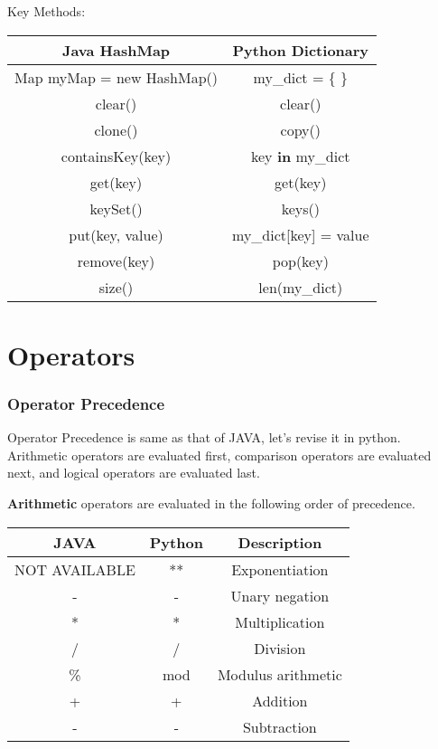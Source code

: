 \documentclass[a4paper,9pt]{extarticle}
\begin{document}
\begin{multicols*}{2}
Key Methods:
\begin{center}
 \begin{tabular}{||c | c||}
 \hline
 Java HashMap & Python Dictionary\\ [1ex]
 \hline\hline
 Map myMap = new HashMap() & my\_dict = \{ \}\\
 \hline
 clear() & clear()\\
 \hline
 clone() & copy()\\
 \hline
 containsKey(key) & key \textbf{in} my\_dict\\
 \hline
 get(key) & get(key)\\
 \hline
 keySet() & keys()\\
 \hline
 put(key, value) & my\_dict[key] = value\\
 \hline
 remove(key) & pop(key)\\
 \hline
 size() & len(my\_dict)\\
 \hline
\end{tabular}
\end{center}

\section{Operators}
\subsubsection{Operator Precedence}
Operator Precedence is same as that of JAVA, let's revise it in python. Arithmetic operators are evaluated first, comparison operators are evaluated next, and logical operators are evaluated last.

\textbf{Arithmetic} operators are evaluated in the following order of precedence.

\begin{center}
 \begin{tabular}{||c | c | c||}
 \hline
 \textbf{JAVA} & \textbf{Python} & \textbf{Description}\\ [1ex]
 \hline\hline
 NOT AVAILABLE & ** & Exponentiation\\
 \hline
 - & -  & Unary negation\\
 \hline
 * & * & Multiplication\\
 \hline
 / & / & Division\\
 \hline
 \% & mod & Modulus arithmetic\\
 \hline
 + & +  & Addition\\
 \hline
 - & - & Subtraction\\
 \hline
\end{tabular}
\end{center}


\end{multicols*}
\end{document}
